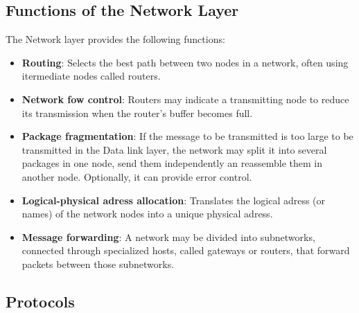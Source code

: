 %
%
%
%
%
%
%

\subsection{Functions of the Network Layer}
The Network layer provides the following functions:
\begin{itemize}
\item \textbf{Routing}: Selects the best path between two nodes in a network, often using itermediate nodes called routers.
\item \textbf{Network fow control}: Routers may indicate a transmitting node to reduce its transmission when the router's buffer becomes full.
\item \textbf{Package fragmentation}: If the message to be transmitted is too large to be transmitted in the Data link layer, the network may split it into several packages in one node, send them independently an reassemble them in another node. Optionally, it can provide error control.
\item \textbf{Logical-physical adress allocation}: Translates the logical adress (or names) of the network nodes into a unique physical adress.
\item \textbf{Message forwarding}: A network may be divided into subnetworks, connected through specialized hosts, called gateways or routers, that forward packets between those subnetworks.
\end{itemize}

\subsection{Protocols}
